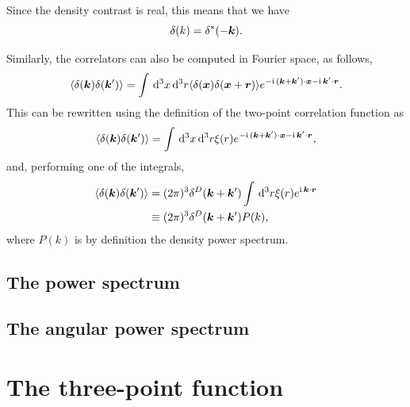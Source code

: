 Since the density contrast is real, this means that we have
\begin{equation}
	\delta(k) = \delta^*(-\bm {k}).
\end{equation}

Similarly, the correlators can also be computed in Fourier space, as follows, 
\begin{equation}
	\langle \delta(\bm {k}) \delta(\bm {k}') \rangle = \int \,\mathrm{d}^3 x \,\mathrm{d}^3 r \langle \delta(\bm {x}) \delta(\bm {x} + \bm{r})\rangle e^{-\mathrm{i\,} (\bm {k} + \bm {k}') \cdot \bm {x} - \mathrm{i\,} \bm {k}' \cdot \bm{r}}.
\end{equation}
This can be rewritten using the definition of the two-point correlation function as 
\begin{equation}
	\langle \delta(\bm {k}) \delta(\bm {k}') \rangle = \int \,\mathrm{d}^3 x \,\mathrm{d}^3 r \xi(r) e^{-\mathrm{i\,} (\bm {k} + \bm {k}') \cdot \bm {x} - \mathrm{i\,} \bm {k}' \cdot \bm{r}},
\end{equation}
and, performing one of the integrals, 
\begin{align}
	\langle \delta(\bm {k}) \delta(\bm {k}') \rangle &= (2\pi)^3 \delta^D(\bm {k} + \bm {k}') \int \,\mathrm{d}^3 r \xi(r) e^{\mathrm{i\,} \bm {k} \cdot \bm{r}} \\
	&\equiv (2\pi)^3 \delta^D(\bm {k} + \bm {k}') P(k),
\end{align}
where $P(k)$ is by definition the density power spectrum.

\subsection{The power spectrum}

\subsection{The angular power spectrum}

\section{The three-point function}

